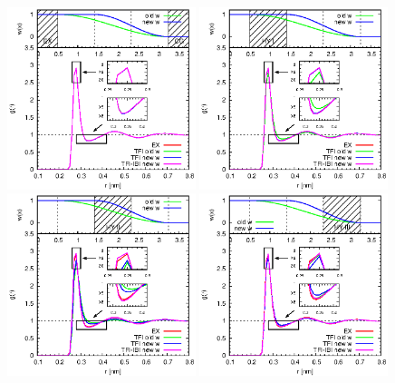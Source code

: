 \documentclass[aps,pre,preprint,unsortedaddress]{revtex4}
\begin{document}
\begin{figure}
  \centering
  \includegraphics[width=0.49\textwidth]{fig.2/rdf-ex-cg.eps}
  \includegraphics[width=0.49\textwidth]{fig.2/rdf-425-516.eps}
  \includegraphics[width=0.49\textwidth]{fig.2/rdf-516-608.eps}
  \includegraphics[width=0.49\textwidth]{fig.2/rdf-608-700.eps}

\end{figure}
\end{document}

